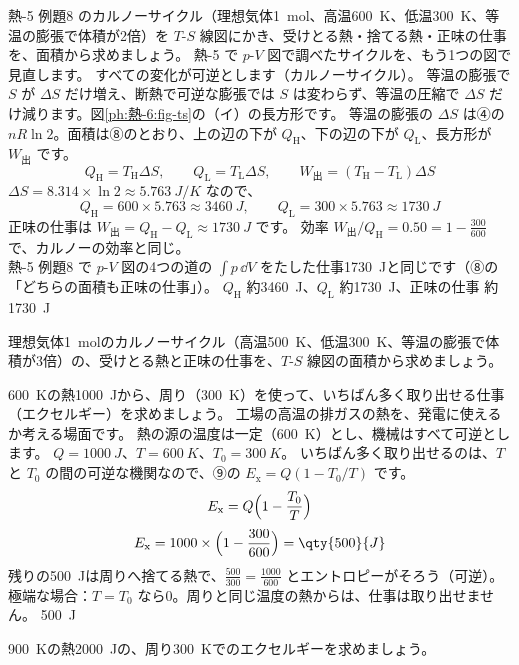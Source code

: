 \label{ph:熱-6:ex6}
\begin{phreidai}
熱-5 例題8 のカルノーサイクル（理想気体\qty{1}{mol}、高温\qty{600}{K}、低温\qty{300}{K}、等温の膨張で体積が2倍）を $T$-$S$ 線図にかき、受けとる熱・捨てる熱・正味の仕事を、面積から求めましょう。
\phbamen
熱-5 で $p$-$V$ 図で調べたサイクルを、もう1つの図で見直します。
\phmushi
すべての変化が可逆とします（カルノーサイクル）。
\phzu
等温の膨張で $S$ が $\Delta S$ だけ増え、断熱で可逆な膨張では $S$ は変わらず、等温の圧縮で $\Delta S$ だけ減ります。図\ref{ph:熱-6:fig-ts}の（イ）の長方形です。
\phriyu
等温の膨張の $\Delta S$ は④の $nR\ln2$。面積は⑧のとおり、上の辺の下が $Q_{\mathrm H}$、下の辺の下が $Q_{\mathrm L}$、長方形が $W_{\text{出}}$ です。
\phtateru
\[Q_{\mathrm H}=T_{\mathrm H}\Delta S,\qquad Q_{\mathrm L}=T_{\mathrm L}\Delta S,\qquad W_{\text{出}}=(T_{\mathrm H}-T_{\mathrm L})\Delta S\]
\phtoku
$\Delta S=8.314\times\ln2\approx\qty{5.763}{J/K}$ なので、
\[Q_{\mathrm H}=600\times5.763\approx\qty{3460}{J},\qquad Q_{\mathrm L}=300\times5.763\approx\qty{1730}{J}\]
正味の仕事は $W_{\text{出}}=Q_{\mathrm H}-Q_{\mathrm L}\approx\qty{1730}{J}$ です。
\phtashikame
効率 $W_{\text{出}}/Q_{\mathrm H}=0.50=1-\tfrac{300}{600}$ で、カルノーの効率と同じ。\\
熱-5 例題8 で $p$-$V$ 図の4つの道の $\int p\,\dd V$ をたした仕事\qty{1730}{J}と同じです（⑧の「どちらの面積も正味の仕事」）。
\kotae $Q_{\mathrm H}$ 約\qty{3460}{J}、$Q_{\mathrm L}$ 約\qty{1730}{J}、正味の仕事 約\qty{1730}{J}
\end{phreidai}
\begin{jibun}
理想気体\qty{1}{mol}のカルノーサイクル（高温\qty{500}{K}、低温\qty{300}{K}、等温の膨張で体積が3倍）の、受けとる熱と正味の仕事を、$T$-$S$ 線図の面積から求めましょう。
\end{jibun}

\label{ph:熱-6:ex7}
\begin{phreidai}[熱のエクセルギー]
\qty{600}{K}の熱\qty{1000}{J}から、周り（\qty{300}{K}）を使って、いちばん多く取り出せる仕事（エクセルギー）を求めましょう。
\phbamen
工場の高温の排ガスの熱を、発電に使えるか考える場面です。
\phmushi
熱の源の温度は一定（\qty{600}{K}）とし、機械はすべて可逆とします。
\phzu
$Q=\qty{1000}{J}$、$T=\qty{600}{K}$、$T_0=\qty{300}{K}$。
\phriyu
いちばん多く取り出せるのは、$T$ と $T_0$ の間の可逆な機関なので、⑨の $E_{\mathrm x}=Q(1-T_0/T)$ です。
\phtateru
\[E_{\mathrm x}=Q\Bigl(1-\frac{T_0}{T}\Bigr)\]
\phtoku
\[E_{\mathrm x}=1000\times\Bigl(1-\frac{300}{600}\Bigr)=\qty{500}{J}\]
\phtashikame
残りの\qty{500}{J}は周りへ捨てる熱で、$\tfrac{500}{300}=\tfrac{1000}{600}$ とエントロピーがそろう（可逆）。\\
極端な場合：$T=T_0$ なら0。周りと同じ温度の熱からは、仕事は取り出せません。
\kotae \qty{500}{J}
\end{phreidai}
\begin{jibun}
\qty{900}{K}の熱\qty{2000}{J}の、周り\qty{300}{K}でのエクセルギーを求めましょう。
\end{jibun}

